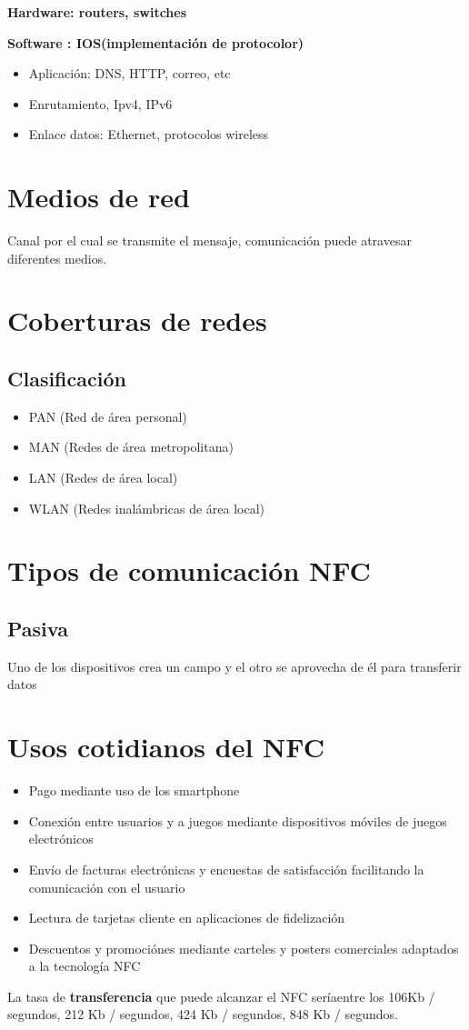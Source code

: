 \documentclass[letterpaper,12pt]{article}
\begin{document}
\begin{sloppypar}
\textbf{Hardware: routers, switches}

\textbf{Software : IOS(implementación de protocolor)}
\begin{itemize}
    \item Aplicación: DNS, HTTP, correo, etc 
    \item Enrutamiento, Ipv4, IPv6 
    \item Enlace datos: Ethernet, protocolos wireless
\end{itemize}

\section{Medios de red}
Canal por el cual se transmite el mensaje, comunicación puede atravesar diferentes medios.

\section{Coberturas de redes}
\subsection{Clasificación}
\begin{itemize}
    \item PAN (Red de área personal)
    \item MAN (Redes de área metropolitana)
    \item LAN (Redes de área local)
    \item WLAN (Redes inalámbricas de área local)
\end{itemize}

\section{Tipos de comunicación NFC}

\subsection{Pasiva}
Uno de los dispositivos crea un campo y el otro se aprovecha de él para transferir datos
\section{Usos cotidianos del NFC}
\begin{itemize}
    \item Pago mediante uso de los smartphone
    \item Conexión entre usuarios y a juegos mediante dispositivos móviles de juegos electrónicos 
    \item Envío de facturas electrónicas y encuestas de satisfacción facilitando la comunicación con el usuario 
    \item Lectura de tarjetas cliente en aplicaciones de fidelización
    \item Descuentos y promociónes mediante carteles y posters comerciales adaptados a la tecnología NFC 
\end{itemize}
La tasa de \textbf{transferencia} que puede alcanzar el NFC seríaentre los 106Kb / segundos, 212 Kb / segundos, 424 Kb / segundos, 848 Kb / segundos.


\end{sloppypar}
\end{document}
